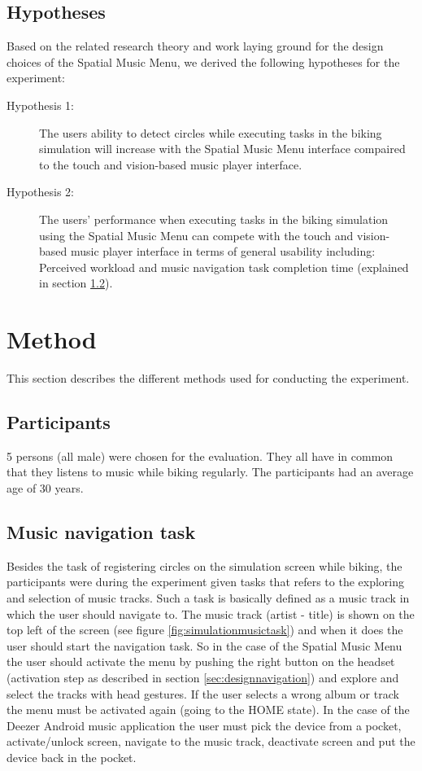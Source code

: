 \subsection{Hypotheses}
\label{sec:evaluationhypothesis}
Based on the related research theory and work laying ground for the design choices of the Spatial Music Menu, we derived the following hypotheses for the experiment:

\begin{description}
\item[Hypothesis 1:] The users ability to detect circles while executing tasks in the biking simulation will increase with the Spatial Music Menu interface compaired to the touch and vision-based music player interface.
\end{description}

\begin{description}
\item[Hypothesis 2:] The users' performance when executing tasks in the biking simulation using the Spatial Music Menu can compete with the touch and vision-based music player interface in terms of general usability including: Perceived workload and music navigation task completion time (explained in section \ref{sec:evaluationmusictask}).
\end{description}


\section{Method}
This section describes the different methods used for conducting the experiment.

\subsection{Participants}
5 persons (all male) were chosen for the evaluation. They all have in common that they listens to music while biking regularly. The participants had an average age of 30 years.

\subsection{Music navigation task}
\label{sec:evaluationmusictask}
Besides the task of registering circles on the simulation screen while biking, the participants were during the experiment given tasks that refers to the exploring and selection of music tracks. Such a task is basically defined as a music track in which the user should navigate to. The music track (artist - title) is shown on the top left of the screen (see figure \ref{fig:simulationmusictask}) and when it does the user should start the navigation task. So in the case of the Spatial Music Menu the user should activate the menu by pushing the right button on the headset (activation step as described in section \ref{sec:designnavigation}) and explore and select the tracks with head gestures. If the user selects a wrong album or track the menu must be activated again (going to the HOME state). In the case of the Deezer Android music application the user must pick the device from a pocket, activate/unlock screen, navigate to the music track, deactivate screen and put the device back in the pocket.

